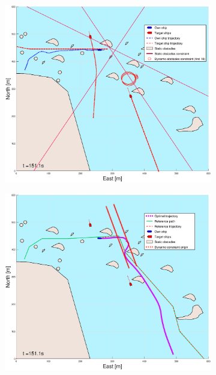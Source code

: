 \begin{figure}[ht]
\begin{subfigure}[b]{0.499\textwidth}
    \end{subfigure}
    \hfill
    \\ 
    \begin{subfigure}[b]{0.49\textwidth}
        \centering
        \includegraphics[width=\textwidth]{Images/Figures/skjergard_m_trafikk_NEW/_Simple_1fig1_time=151}
    \end{subfigure}
    \hfill
    \begin{subfigure}[b]{0.499\textwidth}
        \centering
        \includegraphics[width=\textwidth]{Images/Figures/skjergard_m_trafikk_NEW/_Simple_1fig999_time=151}
    \end{subfigure}
    \hfill
\end{figure}
